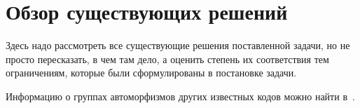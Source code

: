 
\section{Обзор существующих решений}

Здесь надо рассмотреть все существующие решения поставленной задачи, но не просто пересказать, в чем там дело, а оценить степень их соответствия тем ограничениям, которые были сформулированы в постановке задачи.

Информацию о группах автоморфизмов других известных кодов можно найти в~\cite{FirstArticle}.